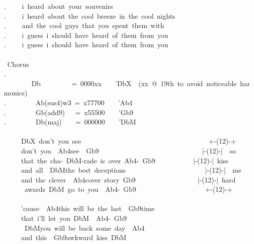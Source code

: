 {. \ \ \ \ i\ heard\ about\ your\ souvenirs\\
. \ \ \ \ i\ heard\ about\ the\ cool\ breeze\ in\ the\ cool\ nights\\
. \ \ \ \ and\ the\ cool\ guys\ that\ you\ spent\ them\ with\\
. \ \ \ \ i\ guess\ i\ should\ have\ heard\ of\ them\ from\ you\\
. \ \ \ \ i\ guess\ i\ should\ have\ heard\ of\ them\ from\ you\\\
\\
\lbrack\ Chorus\rbrack\\
. \ \ \ \ \ \ \ \ Db\ \ \ \ \ \ \ \ \ =\ 0000xx\ \ \ \ 'DbX\ \ (xx\ @\ 19th\ to\ avoid\ noticeable\ harmonics)\\
. \ \ \ \ \ \ \ \ Ab(sus4)w3\ =\ x77700\ \ \ \ 'Ab4\\
. \ \ \ \ \ \ \ \ Gb(add9)\ \ \ =\ x55500\ \ \ \ 'Gb9\\
. \ \ \ \ \ \ \ \ Db(maj)\ \ \ \ =\ 000000\ \ \ \ 'DbM\\
\\
\ \ \ \ \ \lbrack DbX\rbrack\ don't\ you\ see\ \ \ \ \ \ \ \ \ \ \ \ \ \ \ \ \ \ \ \ \ \ \ \ \ \ \ \ \ \ \ \ \ \ \ \ \ +-(12)-+\\
\ \ \ \ \ don't\ you\ \lbrack\ Ab4\rbrack see\ \lbrack\ Gb9\rbrack\ \ \ \ \ \ \ \ \ \ \ \ \ \ \ \ \ \ \ \ \ \ \ \ \ \ \ \ \ \ |-(12)-|\ \ so\\
\ \ \ \ \ that\ the\ cha-\lbrack\ DbM\rbrack-rade\ is\ over\lbrack\ Ab4\rbrack-\lbrack\ Gb9\rbrack\ \ \ \ \ \ \ \ \ \ \ |-(12)-|\ kiss\\
\ \ \ \ \ and\ all\ \lbrack\ DbM\rbrack the\ best\ deceptions\ \ \ \ \ \ \ \ \ \ \ \ \ \ \ \ \ \ \ \ \ \ \ |-(12)-|\ \ me\\
\ \ \ \ \ and\ the\ clever\ \lbrack\ Ab4\rbrack cover\ story\lbrack\ Gb9\rbrack\ \ \ \ \ \ \ \ \ \ \ \ \ \ \ \ \ \ |-(12)-|\ hard\\\
\ \ \ \ \ awards\lbrack\ DbM\rbrack\ go\ to\ you\ \lbrack\ Ab4\rbrack-\lbrack\ Gb9\rbrack\ \ \ \ \ \ \ \ \ \ \ \ \ \ \ \ \ \ \ \ +-(12)-+\\
\\
\ \ \ \ \ 'cause\ \lbrack\ Ab4\rbrack this\ will\ be\ the\ last\ \lbrack\ Gb9\rbrack time\\
\ \ \ \ \ that\ i'll\ let\ you\lbrack\ DbM\rbrack\ \lbrack\ Ab4\rbrack-\lbrack\ Gb9\rbrack\\
\ \ \ \ \ \lbrack\ DbM\rbrack you\ will\ be\ back\ some\ day\ \lbrack\ Ab4\rbrack\\
\ \ \ \ \ and\ this\ \lbrack\ Gb9\rbrack awkward\ kiss\lbrack\ DbM\rbrack\\
}
